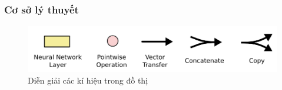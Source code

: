 \subsubsection{Cơ sở lý thuyết}



\begin{figure}[H]
    \centering
    \includegraphics[width=14cm]{Images/Architecture/lstm1.png}
\caption{Diễn giải các kí hiệu trong đồ thị}
\end{figure}

\indent 

